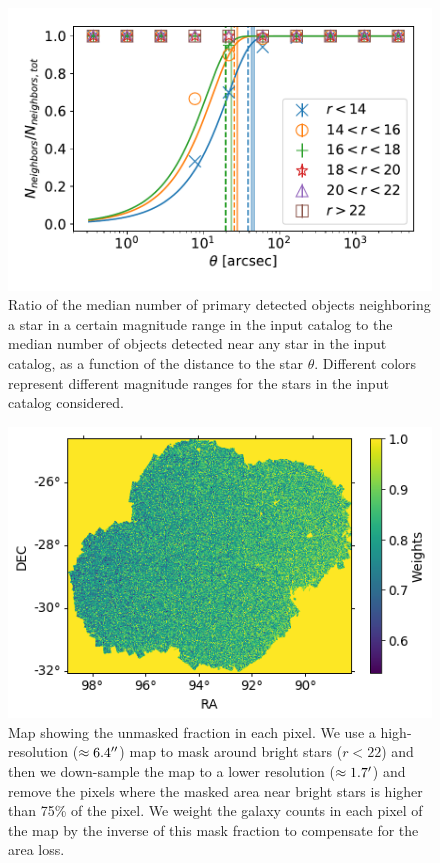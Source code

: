 \documentclass[a4paper,fleqn,usenatbib]{mnras}
\begin{document}
\begin{figure}
\centering
\includegraphics[width=0.9\columnwidth]{bright_object_masking}
\caption{Ratio of the median number of primary detected objects neighboring a star in a certain magnitude range in the input catalog to the median number of objects detected near any star in the input catalog, as a function of the distance to the star $\theta$. Different colors represent different magnitude ranges for the stars in the input catalog considered.}
\label{fig:bright_object_masking}
\end{figure}
\begin{figure}
\centering
\includegraphics[width=0.9\columnwidth]{bo_mask}
\caption{Map showing the unmasked fraction in each pixel. We use a high-resolution ($\approx 6.4 \hbox{$^{\prime\prime}$}$) map to mask around bright stars ($r < 22$) and then we down-sample the map to a lower resolution ($\approx 1.7 \hbox{$^\prime$}$) and remove the pixels where the masked area near bright stars is higher than 75\% of the pixel. We weight the galaxy counts in each pixel of the map by the inverse of this mask fraction to compensate for the area loss.}
\label{fig:bo_mask}
\end{figure} 
\end{document}
